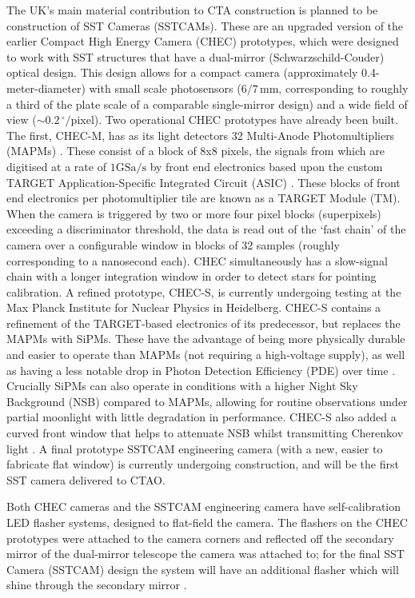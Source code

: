 The UK's main material contribution to CTA construction is planned to be construction of SST Cameras (SSTCAMs). These are an upgraded version of the earlier Compact High Energy Camera (CHEC) prototypes, which were designed to work with SST structures that have a dual-mirror (Schwarzschild-Couder) optical design. This design allows for a compact camera (approximately 0.4-meter-diameter) with small scale photosensors ($\mathrm{6/7\,mm}$, corresponding to roughly a third of the plate scale of a comparable single-mirror design) and a wide field of view ($\mathrm{\sim0.2\,^{\circ}/pixel}$).  Two operational CHEC prototypes have already been built. The first, CHEC-M, has as its light detectors 32 Multi-Anode Photomultipliers (MAPMs) \cite{tomthesis}. These consist of a block of 8x8 pixels, the signals from which are digitised at a rate of $1\mathrm{GSa}/\mathrm{s}$ \cite{tomthesis} by front end electronics based upon the custom TARGET Application-Specific Integrated Circuit (ASIC) \cite{checmpaper}. These blocks of front end electronics per photomultiplier tile are known as a TARGET Module (TM). When the camera is triggered by two or more four pixel blocks (superpixels) exceeding a discriminator threshold, the data is read out of the `fast chain' of the camera over a configurable window in blocks of 32 samples (roughly corresponding to a nanosecond each). CHEC simultaneously has a slow-signal chain with a longer integration window in order to detect stars for pointing calibration. A refined prototype, CHEC-S, is currently undergoing testing at the Max Planck Institute for Nuclear Physics in Heidelberg. CHEC-S contains a refinement of the TARGET-based electronics of its predecessor, but replaces the MAPMs with SiPMs. These have the advantage of being more physically durable and easier to operate than MAPMs (not requiring a high-voltage supply), as well as having a less notable drop in Photon Detection Efficiency (PDE) over time \cite{factphotonstream}. Crucially SiPMs can also operate in conditions with a higher Night Sky Background (NSB) compared to MAPMs, allowing for routine observations under partial moonlight with little degradation in performance. CHEC-S also added a curved front window that helps to attenuate NSB whilst transmitting Cherenkov light \cite{ssticrc}. A final prototype SSTCAM engineering camera (with a new, easier to fabricate flat window) is currently undergoing construction, and will be the first SST camera delivered to CTAO.

Both CHEC cameras and the SSTCAM engineering camera have self-calibration LED flasher systems, designed to flat-field the camera. The flashers on the CHEC prototypes were attached to the camera corners and reflected off the secondary mirror of the dual-mirror telescope the camera was attached to; for the final SST Camera (SSTCAM) design the system will have an additional flasher which will shine through the secondary mirror \cite{richpc}.

